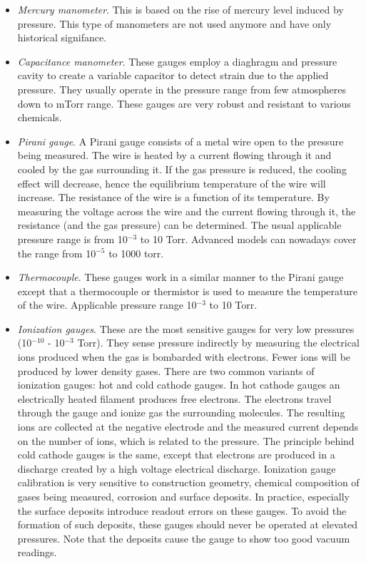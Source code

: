 \documentclass[byrevtex,amssymb,aps,pra,floatfix,letterpaper]{revtex4}
\begin{document}
\begin{itemize}
\item \textit{Mercury manometer}. This is based on the rise of mercury level induced by pressure. This type of manometers are not used anymore and have only historical signifance.
\item \textit{Capacitance manometer}. These gauges employ a diaghragm and pressure cavity to create a variable capacitor to detect strain due to the applied pressure. They usually operate in the pressure range from few atmospheres down to mTorr range. These gauges are very robust and resistant to various chemicals.
\item \textit{Pirani gauge}. A Pirani gauge consists of a metal wire open to the pressure being measured. The wire is heated by a current flowing through it and cooled by the gas surrounding it. If the gas pressure is reduced, the cooling effect will decrease, hence the equilibrium temperature of the wire will increase. The resistance of the wire is a function of its temperature. By measuring the voltage across the wire and the current flowing through it, the resistance (and the gas pressure) can be determined. The usual applicable pressure range is from 10$^{-3}$ to 10 Torr. Advanced models can nowadays cover the range from 10$^{-5}$ to 1000 torr.
\item \textit{Thermocouple}. These gauges work in a similar manner to the Pirani gauge except that a thermocouple or thermistor is used to measure the temperature of the wire. Applicable pressure range 10$^{-3}$ to 10 Torr.
\item \textit{Ionization gauges}. These are the most sensitive gauges for very low pressures (10$^{-10}$ - 10$^{-3}$ Torr). They sense pressure indirectly by measuring the electrical ions produced when the gas is bombarded with electrons. Fewer ions will be produced by lower density gases. There are two common variants of ionization gauges: hot and cold cathode gauges. In hot cathode gauges an electrically heated filament produces free electrons. The electrons travel through the gauge and ionize gas the surrounding molecules. The resulting ions are collected at the negative electrode and the measured current depends on the number of ions, which is related to the pressure. The principle behind cold cathode gauges is the same, except that electrons are produced in a discharge created by a high voltage electrical discharge. Ionization gauge calibration is very sensitive to construction geometry, chemical composition of gases being measured, corrosion and surface deposits. In practice, especially the surface deposits introduce readout errors on these gauges. To avoid the formation of such deposits, these gauges should never be operated at elevated pressures. Note that the deposits cause the gauge to show too good vacuum readings.
\end{itemize}
\end{document}

